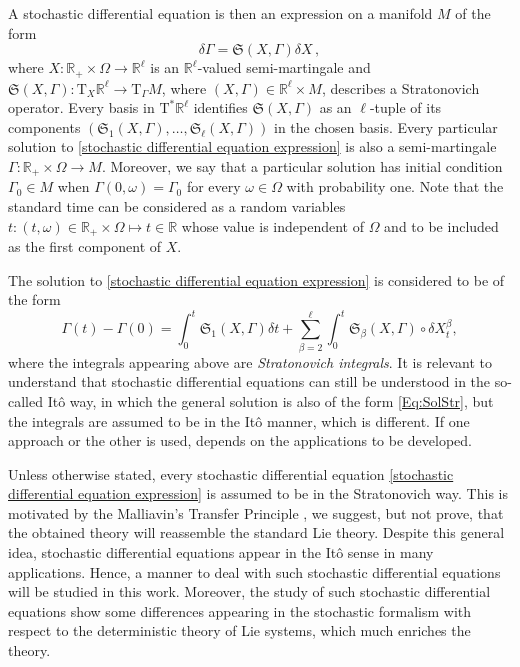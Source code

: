 \documentclass[11pt]{article}
\theoremstyle{plain}
\theoremstyle{definition}
\newcommand{\R}{\mathbb{R}}
\newcommand{\T}{\mathrm{T}}
\begin{document}
A stochastic differential equation is then an expression on a manifold $M$ of the form
\begin{equation}
  \label{stochastic differential equation expression} \delta \Gamma = \mathfrak{S} (X,
  \Gamma) \delta X\,,
\end{equation}
where $X:\mathbb{R}_+ \times \Omega \rightarrow \R^\ell$ is an
$\R^\ell$-valued semi-martingale and $\mathfrak{S} (X, \Gamma) : \T_X \mathbb{R}^\ell
\to \T_\Gamma M$, where $(X,\Gamma)\in \mathbb{R}^\ell\times M$, describes a Stratonovich operator. Every basis in
$\T^{\ast} \R^\ell$ identifies $\mathfrak{S}(X,
\Gamma)$ as an $\ell$-tuple of its components $(\mathfrak{S}_1 (X, \Gamma), \ldots, \mathfrak{S}_\ell (X, \Gamma))$ in the chosen basis. Every particular solution to \eqref{stochastic differential equation expression} is also a semi-martingale $
\Gamma:\mathbb{R}_+\times \Omega\rightarrow M$. Moreover, we say that a particular solution has initial condition $\Gamma_0
\in M$ when $\Gamma(0,\omega)=\Gamma_0$ for every $\omega\in \Omega$ with probability one. Note that the standard time can be considered as a random variables $t:(t,\omega)\in \mathbb{R}_+\times \Omega\mapsto t\in\mathbb{R}$ whose value is independent of $\Omega$ and to be included as the first component of $X$.

The solution to \eqref{stochastic differential equation expression} is considered to be of the form
\begin{equation}\label{Eq:SolStr}
\Gamma(t)-\Gamma(0)=\int_0^t\mathfrak{S}_1(X,\Gamma)\delta t+\sum_{\beta=2}^{\ell}
\int_0^t\mathfrak{S}_\beta(X,\Gamma) \circ \delta X^\beta_t,
\end{equation}
where the integrals appearing above are {\it Stratonovich integrals}. It is relevant to understand that stochastic differential equations can still be understood in the so-called It\^{o} way, in which the general solution is also of the form \eqref{Eq:SolStr}, but the integrals are assumed to be in the It\^{o} manner, which is different. If one approach or the other is used, depends on the applications to be developed.

Unless otherwise stated, every stochastic differential equation \eqref{stochastic differential equation expression} is assumed to be in the Stratonovich way. This is motivated by the Malliavin’s
Transfer Principle \cite{Ma78}, we suggest, but not prove, that the obtained theory will reassemble the standard Lie theory. Despite this general idea, stochastic differential equations appear in the It\^{o} sense in many applications. Hence, a manner to deal with such stochastic differential equations will be studied in this work. Moreover, the study of such stochastic differential equations show some differences appearing in the stochastic formalism with respect to the deterministic theory of Lie systems, which much enriches the theory.
\end{document}
